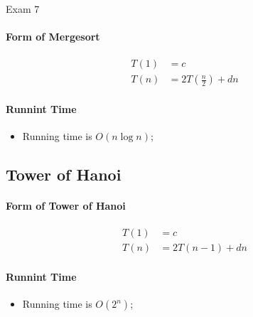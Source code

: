 \documentclass{note}
\begin{document}
\begin{note}{Exam 7}
    \paragraph{Form of Mergesort}
    \begin{align*}
        T(1) &= c \\
        T(n) &= 2 T \left( \frac{n}{2} \right) + d n
    \end{align*}

    \paragraph{Runnint Time}
    \begin{itemize}
        \item Running time is $ O \left( n \log n \right) $;
    \end{itemize}

    \subsection{Tower of Hanoi}

    \paragraph{Form of Tower of Hanoi}
    \begin{align*}
        T(1) &= c \\
        T(n) &= 2 T \left( n - 1 \right) + d n
    \end{align*}

    \paragraph{Runnint Time}
    \begin{itemize}
        \item Running time is $ O \left( 2^{n} \right) $;
    \end{itemize}

\end{note}
\end{document}
